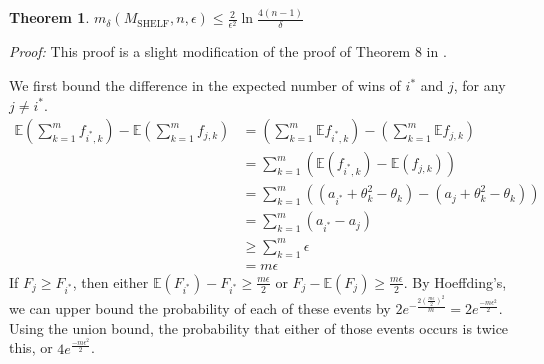 \documentclass[letterpaper,12pt]{article}
\newcommand{\E}{\mathbb{E}}
\newcommand{\1}{\mathbbm{1}}
\newcommand{\shelf}{M_{\mathrm{SHELF}}}
\newtheorem{theorem}{Theorem}
\begin{document}


\begin{theorem}
  \label{shelf_bound}
    $m_\delta(\shelf, n, \epsilon) \leq \frac{2}{\epsilon^2} \ln \frac{4(n-1)}{\delta}$
\end{theorem}
\emph{Proof:} This proof is a slight modification of the proof of Theorem 8 in \cite{witkowski2018incentive}.

We first bound the difference in the expected number of wins of $i^*$ and $j$, for any $j \neq i^*$. 
\begin{align*}
  \E \left( \sum_{k=1}^m f_{i^*, k}\right) - \E \left( \sum_{k=1}^m f_{j, k}\right)
  &= \left( \sum_{k=1}^m \E f_{i^*, k}\right) - \left( \sum_{k=1}^m \E f_{j, k}\right)\\
  &= \sum_{k=1}^m \left(\E (f_{i^*, k}) - \E (f_{j, k})\right)\\
  &= \sum_{k=1}^m \left((a_{i^*} + \theta_k^2 - \theta_k) - (a_j + \theta_k^2 - \theta_k)\right)\\
  &= \sum_{k=1}^m \left(a_{i^*} - a_j\right)\\
  &\geq \sum_{k=1}^m \epsilon\\
  &=m \epsilon
\end{align*}
If $F_j \geq F_{i^*}$, then either $\E(F_{i^*}) - F_{i^*} \geq \frac{m \epsilon}{2}$ or $F_j - \E(F_j) \geq \frac{m \epsilon}{2}$. By Hoeffding's, we can upper bound the probability of each of these events by $2 e^{-\frac{2 (\frac{m \epsilon}{2})^2}{m}} = 2 e^{\frac{- m \epsilon^2}{2}}$. Using the union bound, the probability that either of those events occurs is twice this, or $4 e^{\frac{- m \epsilon^2}{2}}$.
\end{document}
